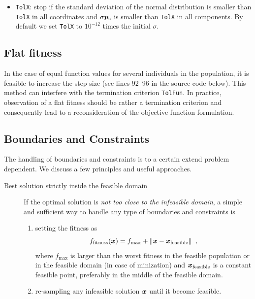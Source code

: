 \documentclass{article} %
\newcommand{\kom}[1]{}
\newcommand{\ve}[1]{\mathchoice{\mbox{\boldmath$\displaystyle#1$}}
  {\mbox{\boldmath$\textstyle#1$}} {\mbox{\boldmath$\scriptstyle#1$}}
  {\mbox{\boldmath$\scriptscriptstyle#1$}}}
\newcommand{\sig}{\ensuremath{\sigma}}
\newcommand{\pc}{\ve{p}_\mathrm{c}}
\newcommand{\x}{\ve{x}}
\begin{document}
\begin{appendix}
\begin{itemize}
\item \texttt{TolX}: stop if the standard deviation of the normal distribution is
  smaller than \texttt{TolX} in all coordinates and $\sig\pc$ is smaller than
  \texttt{TolX} in all components. By default we set \texttt{TolX} to
  $10^{-12}$ times the initial $\sigma$.

\end{itemize}

\subsection{Flat fitness} In the case of equal function
  values for several individuals in the population, it is feasible to
  increase the step-size (see lines 92--96 in the source code
  below). This method can interfere with the termination criterion
  \texttt{TolFun}. In practice, observation of a flat fitness should
  be rather a termination criterion and consequently lead to a
  reconsideration of the objective function formulation.

\kom{\item Termination criteria: defaults, restart,...}


\subsection{Boundaries and Constraints} The handling of boundaries and 
 constraints is to a certain extend problem dependent. We discuss a few 
 principles and useful approaches. 

\begin{description}
 \item[Best solution strictly inside the feasible domain] If the optimal solution is \emph{not too close to the infeasible
 domain}, a simple and sufficient way to handle any type of boundaries and constraints is
 
 \begin{enumerate}
 \item setting the fitness as
%
 \begin{equation} \label{eq:pen}
   f_\mathrm{fitness}(\ve{x}) = f_\mathrm{max} +
   \|\ve{x}-\ve{x}_{\mathrm{feasible}}\| \enspace,
 \end{equation}
%
 where $f_\mathrm{max}$ is larger than the worst fitness in the feasible
 population or in the feasible domain (in case of minization) and $\ve{x}_{\mathrm{feasible}}$
 is a constant feasible point, preferably in the middle of the
 feasible domain.
 \item re-sampling any infeasible solution $\x$ until it
 become feasible. 
 \end{enumerate}


\end{description}
\end{appendix}
\end{document}
